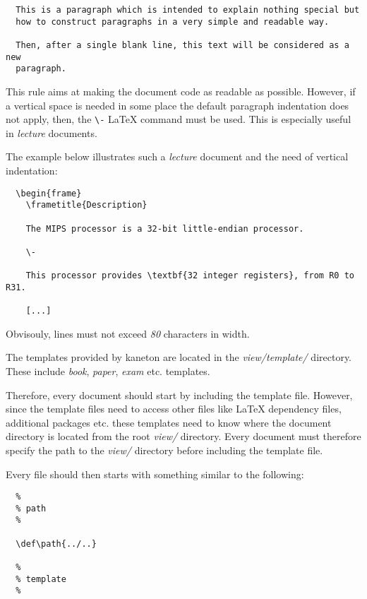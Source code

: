 \begin{verbatim}
  This is a paragraph which is intended to explain nothing special but
  how to construct paragraphs in a very simple and readable way.

  Then, after a single blank line, this text will be considered as a new
  paragraph.
\end{verbatim}

This rule aims at making the document code as readable as possible. However,
if a vertical space is needed in some place the default paragraph indentation
does not apply, then, the \verb|\-| {\LaTeX} command must be used. This is
especially useful in \textit{lecture} documents.

The example below illustrates such a \textit{lecture} document and the
need of vertical indentation:

\begin{verbatim}
  \begin{frame}
    \frametitle{Description}

    The MIPS processor is a 32-bit little-endian processor.

    \-

    This processor provides \textbf{32 integer registers}, from R0 to R31.

    [...]
\end{verbatim}

Obvisouly, lines must not exceed \textit{80} characters in width.

The templates provided by kaneton are located in the \textit{view/template/}
directory. These include \textit{book}, \textit{paper}, \textit{exam} etc.
templates.

Therefore, every document should start by including the template file.
However, since the template files need to access other files like
{\LaTeX} dependency files, additional packages etc. these templates need to
know where the document directory is located from the root \textit{view/}
directory. Every document must therefore specify the path to the \textit{view/}
directory before including the template file.

Every file should then starts with something similar to the following:

\begin{verbatim}
  %
  % path
  %

  \def\path{../..}

  %
  % template
  %

  
\end{verbatim}

